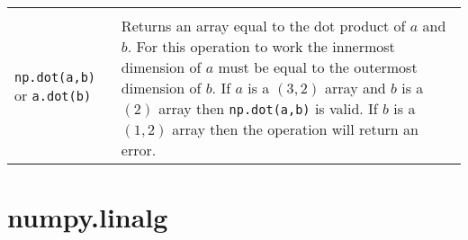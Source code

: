\begin{tabular}[]{@{}ll@{}}
\begin{minipage}[t]{0.72\columnwidth}
\end{minipage}\tabularnewline

\begin{minipage}[t]{0.22\columnwidth}\raggedright
\lstinline!np.dot(a,b)! or \lstinline!a.dot(b)!
\end{minipage} & \begin{minipage}[t]{0.72\columnwidth}\raggedright
Returns an array equal to the dot product of \(a\) and \(b\). For this
operation to work the innermost dimension of \(a\) must be equal to the
outermost dimension of \(b\). If \(a\) is a \((3,2)\) array and \(b\) is
a \((2)\) array then \lstinline!np.dot(a,b)! is valid. If \(b\) is a
\((1,2)\) array then the operation will return an error.
\end{minipage}\tabularnewline

\bottomrule
\end{tabular}

\section{numpy.linalg}\label{numpy.linalg}

